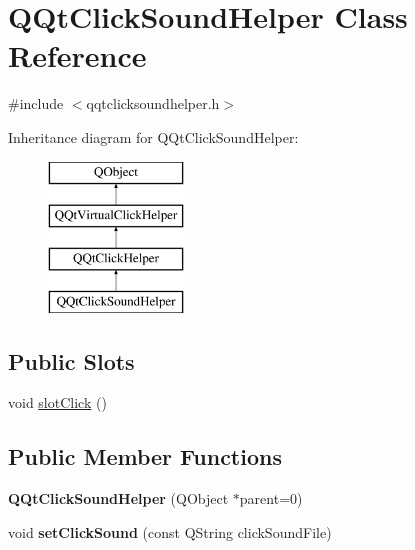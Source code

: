 \hypertarget{class_q_qt_click_sound_helper}{}\section{Q\+Qt\+Click\+Sound\+Helper Class Reference}
\label{class_q_qt_click_sound_helper}


{\ttfamily \#include $<$qqtclicksoundhelper.\+h$>$}

Inheritance diagram for Q\+Qt\+Click\+Sound\+Helper\+:\begin{figure}[H]
\begin{center}
\leavevmode
\includegraphics[height=4.000000cm]{class_q_qt_click_sound_helper}
\end{center}
\end{figure}
\subsection*{Public Slots}
\begin{DoxyCompactItemize}
\item 
void \mbox{\hyperlink{class_q_qt_click_sound_helper_a3bddaf8bb91f01bc5e14a60ec0683ec8}{slot\+Click}} ()
\end{DoxyCompactItemize}
\subsection*{Public Member Functions}
\begin{DoxyCompactItemize}
\item 
\mbox{\label{class_q_qt_click_sound_helper_aab1b7794c1f85cb8fe13b70997cb1b0a}} 
{\bfseries Q\+Qt\+Click\+Sound\+Helper} (Q\+Object $\ast$parent=0)
\item 
\mbox{\label{class_q_qt_click_sound_helper_a186a9d9a7f857aca518b816ea1aeb0b6}} 
void {\bfseries set\+Click\+Sound} (const Q\+String click\+Sound\+File)
\end{DoxyCompactItemize}

